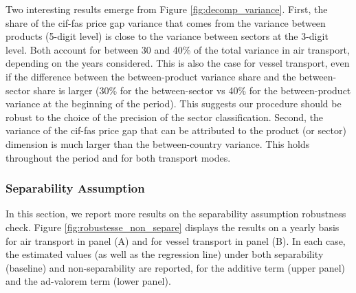 \documentclass[11pt,twoside, authoryear]{elsarticle}
\begin{document}
Two interesting results emerge from Figure \ref{fig:decomp_variance}.
First, the share of the cif-fas price gap variance that comes from the variance between products (5-digit level) is close to the variance between sectors at the 3-digit level.
Both account for between 30 and 40\% of the total variance in air transport, depending on the years considered.
This is also the case for vessel transport, even if the difference between the between-product variance share and the between-sector share is larger (30\% for the between-sector vs 40\% for the between-product variance at the beginning of the period).
This suggests our procedure should be robust to the choice of the precision of the sector classification.
Second, the variance of the cif-fas price gap that can be attributed to the product (or sector) dimension is much larger than the between-country variance.
This holds throughout the period and for both transport modes.


\subsubsection{Separability Assumption}


In this section, we report more results on the separability assumption robustness check. Figure \ref{fig:robustesse_non_separe} displays the results on a yearly basis for air transport in panel (A) and for vessel transport in panel (B). In each case, the estimated values (as well as the regression line) under both separability (baseline) and non-separability are reported, for the additive term (upper panel) and the ad-valorem term (lower panel).
\end{document}
